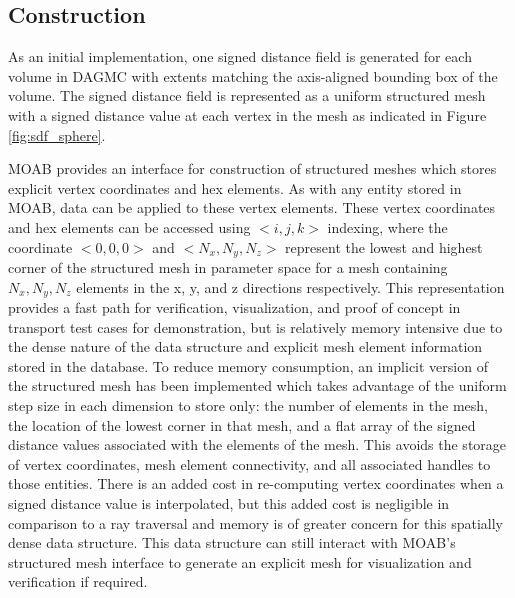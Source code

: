 \subsection{Construction}

As an initial implementation, one signed distance field is generated for each
volume in DAGMC with extents matching the axis-aligned bounding box of the
volume. The signed distance field is represented as a uniform structured mesh
with a signed distance value at each vertex in the mesh as indicated in Figure
\ref{fig:sdf_sphere}.

MOAB provides an interface for construction of structured meshes which stores
explicit vertex coordinates and hex elements. As with any
entity stored in MOAB, data can be applied to these vertex elements. These vertex
coordinates and hex elements can be accessed using $<i,j,k>$ indexing, where the
coordinate $<0,0,0>$ and $<N_{x}, N_{y}, N_{z}>$ represent the lowest and
highest corner of the structured mesh in parameter space for a mesh containing
$N_{x},N_{y},N_{z}$ elements in the x, y, and z directions respectively. This
representation provides a fast path for verification, visualization, and proof
of concept in transport test cases for demonstration, but is relatively memory
intensive due to the dense nature of the data structure and explicit mesh
element information stored in the database. To reduce  memory consumption,
an implicit version of the structured mesh has been implemented which takes
advantage of the uniform step size in each dimension to store only: the number
of elements in the mesh, the location of the lowest corner in that mesh, and a
flat array of the signed distance values associated with the elements of the
mesh.
This avoids the storage of vertex coordinates, mesh element connectivity, and
all associated handles to those entities. There is an added cost in re-computing
vertex coordinates when a signed distance value is interpolated, but this added
cost is negligible in comparison to a ray traversal and memory is of greater
concern for this spatially dense data structure. This data structure can still
interact with MOAB's structured mesh interface to generate an explicit mesh for
visualization and verification if required.



